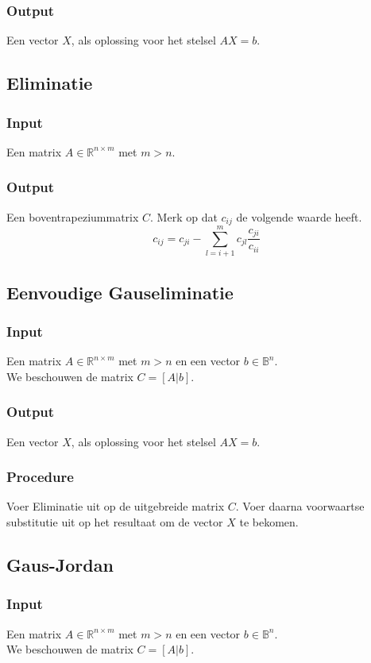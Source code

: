 \documentclass[samenvatting.tex]{subfiles}
\begin{document}
\subsubsection*{Output}
Een vector $X$, als oplossing voor het stelsel $AX=b$.

\subsection{Eliminatie}
\subsubsection*{Input}
Een matrix $A \in \mathbb{R}^{n\times m}$ met $m>n$.
\subsubsection*{Output}
Een boventrapeziummatrix $C$.
Merk op dat $c_{ij}$ de volgende waarde heeft.
\[
c_{ij} = c_{ji} - \sum_{l=i+1}^m c_{jl}\frac{c_{ji}}{c_{ii}}
\]

\subsection{Eenvoudige Gauseliminatie}
\subsubsection*{Input}
Een matrix $A \in \mathbb{R}^{n\times m}$ met $m>n$ en een vector $b \in \mathbb{B}^{n}$.\\
We beschouwen de matrix $C = [A|b]$.
\subsubsection*{Output}
Een vector $X$, als oplossing voor het stelsel $AX=b$.
\subsubsection*{Procedure}
Voer Eliminatie uit op de uitgebreide matrix $C$. Voer daarna voorwaartse substitutie uit op het resultaat om de vector $X$ te bekomen.

\subsection{Gaus-Jordan}
\subsubsection*{Input}
Een matrix $A \in \mathbb{R}^{n\times m}$ met $m>n$ en een vector $b \in \mathbb{B}^{n}$.\\
We beschouwen de matrix $C = [A|b]$.
\end{document}
